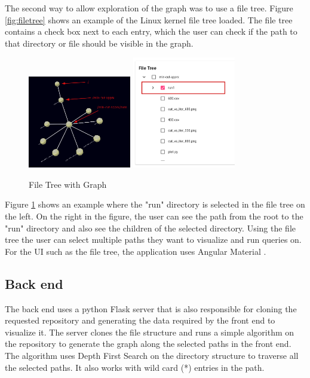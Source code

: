 The second way to allow exploration of the graph was to use a file tree. Figure \ref{fig:filetree} shows an example of the Linux kernel file tree loaded. The file tree contains a check box next to each entry, which the user can check if the path to that directory or file should be visible in the graph.

\begin{figure} [!htbp]
    \includegraphics[width=4.5cm]{figs/file-tree-example.png} \hfill
    \includegraphics[width=4.5cm]{figs/file-tree-example2.png}
    \caption{ File Tree with Graph }
    \label{fig:filetreegraph}
\end{figure}

Figure \ref{fig:filetreegraph} shows an example where the "run" directory is selected in the file tree on the left. On the right in the figure, the user can see the path from the root to the "run" directory and also see the children of the selected directory. Using the file tree the user can select multiple paths they want to visualize and run queries on. For the UI such as the file tree, the application uses Angular Material \cite{angularmaterial}.
\subsection{Back end}

The back end uses a python Flask server that is also responsible for cloning the requested repository and generating the data required by the front end to visualize it. The server clones the file structure and runs a simple algorithm on the repository to generate the graph along the selected paths in the front end. The algorithm uses Depth First Search on the directory structure to traverse all the selected paths. It also works with wild card (*) entries in the path.

